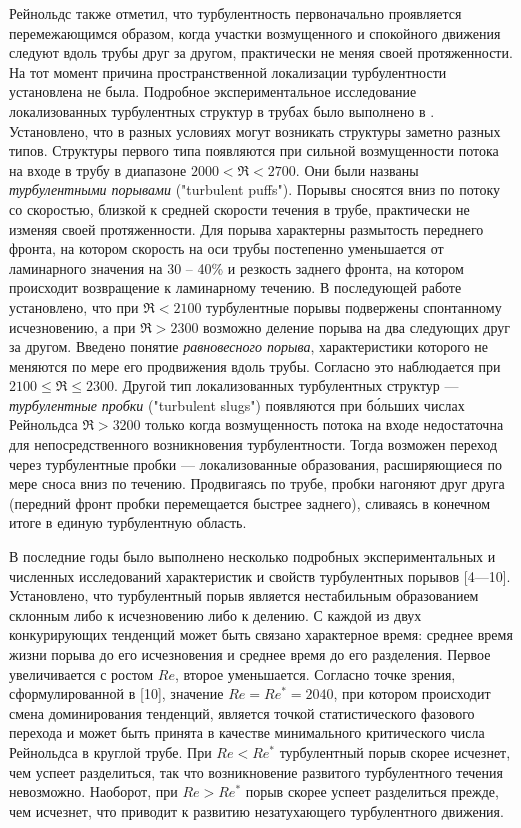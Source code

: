 Рейнольдс также отметил, что турбулентность первоначально проявляется перемежающимся образом, когда участки возмущенного и спокойного движения следуют вдоль трубы друг за другом, практически не меняя своей протяженности. На тот момент причина пространственной локализации турбулентности установлена не была. Подробное экспериментальное исследование локализованных турбулентных структур в трубах было выполнено в \cite{Wygnanski1973}. Установлено, что в разных условиях могут возникать структуры заметно разных типов. Структуры первого типа появляются при сильной возмущенности потока на входе в трубу в диапазоне $2000<\Re<2700$. Они были названы {\it турбулентными порывами} ("turbulent puffs"). Порывы сносятся вниз по потоку со скоростью, близкой к средней скорости течения в трубе, практически не изменяя своей протяженности. Для порыва характерны размытость переднего фронта, на котором скорость на оси трубы постепенно уменьшается от ламинарного значения на 30 -- 40\% и резкость заднего фронта, на котором происходит возвращение к ламинарному течению. В последующей работе \cite{Wygnanski1975} установлено, что при $\Re<2100$ турбулентные порывы подвержены спонтанному исчезновению, а при $\Re>2300$ возможно деление порыва на два следующих друг за другом. Введено понятие {\it равновесного порыва}, характеристики которого не меняются по мере его продвижения вдоль трубы. Согласно \cite{Wygnanski1975} это наблюдается при $2100\leqslant \Re \leqslant 2300$. Другой тип локализованных турбулентных структур --- {\it турбулентные пробки} ("turbulent slugs") появляются при б\'{о}льших числах Рейнольдса $\Re>3200$ только когда возмущенность потока на входе недостаточна для непосредственного возникновения турбулентности. Тогда возможен переход через турбулентные пробки --- локализованные образования, расширяющиеся по мере сноса вниз по течению. Продвигаясь по трубе, пробки нагоняют друг друга (передний фронт пробки перемещается быстрее заднего), сливаясь в конечном итоге в единую турбулентную область.


В последние годы было выполнено несколько подробных экспериментальных и численных исследований характеристик и свойств турбулентных порывов [4---10]. Установлено, что турбулентный порыв является нестабильным образованием склонным либо к исчезновению либо к делению. С каждой из двух конкурирующих тенденций может быть связано характерное время: среднее время жизни порыва до его исчезновения и среднее время до его разделения. Первое увеличивается с ростом $Re$, второе уменьшается. Согласно точке зрения, сформулированной в [10], значение $Re=Re^*=2040$, при котором происходит смена доминирования тенденций, является точкой статистического фазового перехода и может быть принята в качестве минимального критического числа Рейнольдса в круглой трубе. При $Re<Re^*$ турбулентный порыв скорее исчезнет, чем успеет разделиться, так что возникновение развитого турбулентного течения невозможно. Наоборот, при $Re>Re^*$ порыв скорее успеет разделиться прежде, чем исчезнет, что приводит к развитию незатухающего турбулентного движения.


